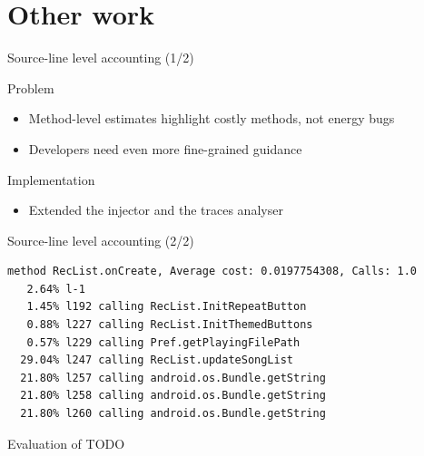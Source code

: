 \section{Other work}
%
%
\begin{frame}{Source-line level accounting (1/2)}
\begin{block}{Problem}
\begin{itemize}
\item Method-level estimates highlight costly methods, not energy bugs
\item Developers need even more fine-grained guidance
\end{itemize}
\end{block}
\begin{block}{Implementation}
\begin{itemize}
\item Extended the injector and the traces analyser
\end{itemize}
\end{block}
\end{frame}
%
%
\begin{frame}[fragile]{Source-line level accounting (2/2)}
\centering
{\tiny%
\begin{lstlisting}
method RecList.onCreate, Average cost: 0.0197754308, Calls: 1.0
   2.64% l-1
   1.45% l192 calling RecList.InitRepeatButton
   0.88% l227 calling RecList.InitThemedButtons
   0.57% l229 calling Pref.getPlayingFilePath
  29.04% l247 calling RecList.updateSongList
  21.80% l257 calling android.os.Bundle.getString
  21.80% l258 calling android.os.Bundle.getString
  21.80% l260 calling android.os.Bundle.getString
\end{lstlisting}}
\end{frame}
%
%
\begin{frame}{Evaluation of \orka{}}
TODO
\end{frame}
%
%

